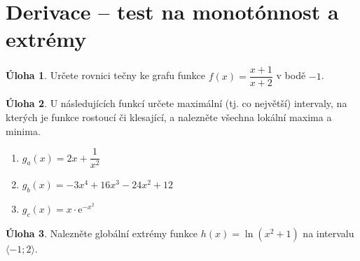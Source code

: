 \documentclass[12pt,a4paper]{article}
\theoremstyle{definition}
\newtheorem{uloha}{Úloha}
\def\ee{\mathrm{e}}
\begin{document}
\section*{Derivace -- test na monotónnost a extrémy}


\begin{uloha}
Určete rovnici tečny %
ke grafu funkce $f(x) = \dfrac{x+1}{x+2}$ v bodě $-1$.
\end{uloha}


\begin{uloha}
U následujících funkcí určete maximální (tj. co největší) intervaly, na kterých je funkce rostoucí či klesající, a nalezněte všechna lokální maxima a minima.
\begin{enumerate}
	\item $g_a(x) = 2x + \dfrac{1}{x^2}$
	\item $g_b(x) = -3x^4 + 16x^3 - 24x^2 + 12$
	\item $g_c(x) = x \cdot \ee^{-x^2}$
\end{enumerate}
\end{uloha}


\begin{uloha}
Nalezněte globální extrémy funkce 
	$h(x) = \ln(x^2 + 1)$  na intervalu $\langle-1; 2\rangle$.
\end{uloha}
\end{document}
